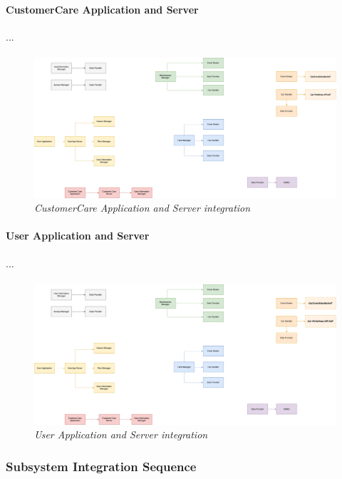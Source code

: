 \paragraph{CustomerCare Application and Server} 
...
\paragraph{}
		
		\begin{figure}[h]
			\centering
			\includegraphics[width=0.8\linewidth]{img/Integration3c}
			\caption{
				\label{fig:ccAppServer} 
				\emph{CustomerCare Application and Server integration}
			}
		\end{figure}
		
\paragraph{User Application and Server} 
...
\paragraph{}
		
		\begin{figure}[h]
			\centering
			\includegraphics[width=0.8\linewidth]{img/Integration4}
			\caption{
				\label{fig:userAppServer} 
				\emph{User Application and Server integration}
			}
		\end{figure}

\clearpage 

\subsubsection{Subsystem Integration Sequence}

